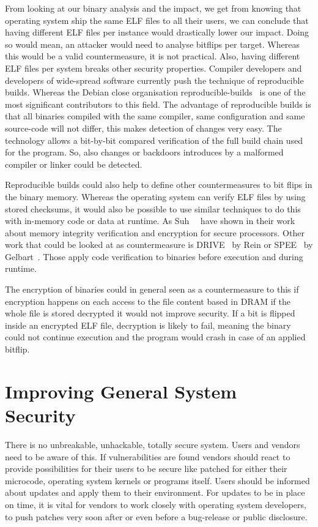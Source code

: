 From looking at our binary analysis and the impact, we get from knowing that
operating system ship the same ELF files to all their users, we can conclude
that having different ELF files per instance would drastically lower our impact.
Doing so would mean, an attacker would need to analyse bitflips per target.
Whereas this would be a valid countermeasure, it is not practical. Also, having
different ELF files per system breaks other security properties. Compiler
developers and developers of wide-spread software currently push the technique
of reproducible builds. Whereas the Debian close organisation
reproducible-builds~\cite{reprobuilds} is one of the most significant
contributors to this field. The advantage of reproducible builds is that all
binaries compiled with the same compiler, same configuration and same
source-code will not differ, this makes detection of changes very easy. The
technology allows a bit-by-bit compared verification of the full build chain
used for the program. So, also changes or backdoors introduces by a malformed
compiler or linker could be detected.

Reproducible builds could also help to define other countermeasures to bit flips
in the binary memory. Whereas the operating system can verify ELF files by using
stored checksums, it would also be possible to use similar techniques to do this
with in-memory code or data at runtime. As Suh~\etal~\cite{memintegrity} have
shown in their work about memory integrity verification and encryption for
secure processors. Other work that could be looked at as countermeasure is
DRIVE~\cite{drive} by Rein or SPEE~\cite{spee} by Gelbart~\etal. Those apply
code verification to binaries before execution and during runtime.

The encryption of binaries could in general seen as a countermeasure to this if
encryption happens on each access to the file content based in DRAM if the whole
file is stored decrypted it would not improve security. If a bit is flipped
inside an encrypted ELF file, decryption is likely to fail, meaning the binary
could not continue execution and the program would crash in case of an applied
bitflip.

\section{Improving General System Security}

There is no unbreakable, unhackable, totally secure system. Users and vendors
need to be aware of this. If vulnerabilities are found vendors should react to
provide possibilities for their users to be secure like patched for either their
microcode, operating system kernels or programs itself. Users should be informed
about updates and apply them to their environment. For updates to be in place on
time, it is vital for vendors to work closely with operating system developers,
to push patches very soon after or even before a bug-release or public
disclosure.

